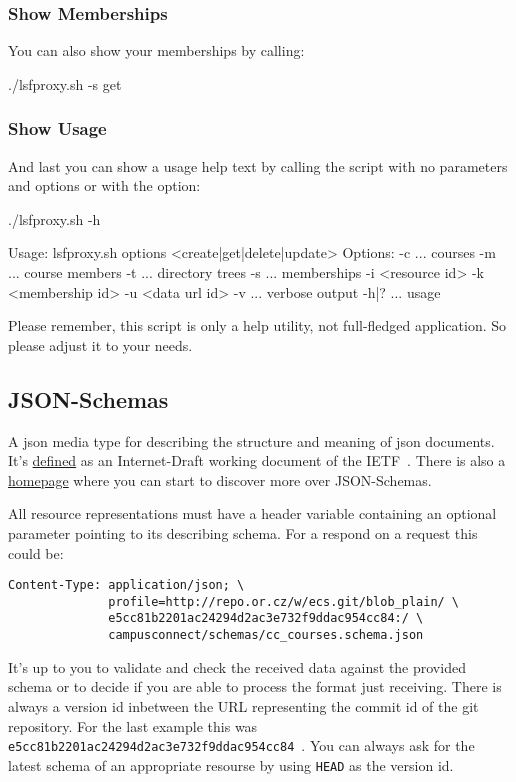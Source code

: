 \subsubsection{Show Memberships}
You can also show your memberships by calling:
\begin{code}
  ./lsfproxy.sh -s get
\end{code}

\subsubsection{Show Usage}
And last you can show a usage help text by calling the script with no
parameters and options or with the  option:
\begin{code}
  ./lsfproxy.sh -h

  Usage: lsfproxy.sh options <create|get|delete|update>
  Options:
    -c ... courses
    -m ... course members
    -t ... directory trees
    -s ... memberships
    -i <resource id>
    -k <membership id>
    -u <data url id>
    -v   ... verbose output
    -h|? ... usage
\end{code}
Please remember, this script is only a help utility, not full-fledged
application. So please adjust it to your needs. 

\hypertarget{campusconnect_json_schemas}{}
\subsection{JSON-Schemas}
A json media type for describing the structure and meaning of json documents.
It's \href{http://tools.ietf.org/html/draft-zyp-json-schema-03}{defined} as an
Internet-Draft working document of the IETF~. There is also a \href{http://json-schema.org}{homepage} where you can
start to discover more over JSON-Schemas.

All resource representations must have a  header variable
containing an optional parameter  pointing to its describing
schema. For a respond on a  request this could be:
\begin{verbatim}
Content-Type: application/json; \
              profile=http://repo.or.cz/w/ecs.git/blob_plain/ \
              e5cc81b2201ac24294d2ac3e732f9ddac954cc84:/ \
              campusconnect/schemas/cc_courses.schema.json
\end{verbatim}
It's up to you to validate and check the received data against the provided
schema or to decide if you are able to process the format just receiving. There
is always a version id inbetween the  URL representing the commit
id of the git repository. For the last \hv{Content-Type} example this was
\verb!e5cc81b2201ac24294d2ac3e732f9ddac954cc84!~. You can always ask for the
latest schema of an appropriate resourse by using \verb!HEAD! as the version
id.

